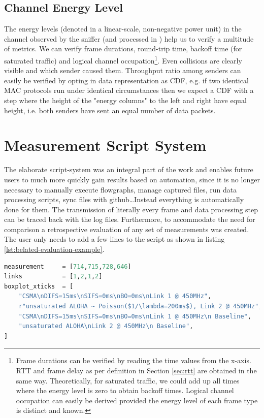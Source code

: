\subsection{Channel Energy Level}

The energy levels (denoted in a linear-scale, non-negative power unit) in the channel observed by the sniffer (and processed in ) help us to verify a multitude of metrics. We can verify frame durations, round-trip time, backoff time (for saturated traffic) and logical channel occupation\footnote{Frame durations can be verified by reading the time values from the x-axis. RTT and frame delay as per definition in Section \ref{sec:rtt} are obtained in the same way. Theoretically, for saturated traffic, we could add up all times where the energy level is zero to obtain backoff times. Logical channel occupation can easily be derived provided the energy level of each frame type is distinct and known.}. Even collisions are clearly visible and which sender caused them. Throughput ratio among senders can easily be verified by opting in data representation as CDF, e.g. if two identical MAC protocols run under identical circumstances then we expect a CDF with a step where the height of the "energy columns" to the left and right have equal height, i.e. both senders have sent an equal number of data packets.

\section{Measurement Script System}
\label{sec:script-system}

The elaborate script-system was an integral part of the work and enables future users to much more quickly gain results based on automation, since it is no longer necessary to manually execute flowgraphs, manage captured files, run data processing scripts, sync files with github\ldots Instead everything is automatically done for them. The transmission of literally every frame and data processing step can be traced back with the log files. Furthermore, to accommodate the need for comparison a retrospective evaluation of any set of measurements  was created. The user only needs to add a few lines to the script as shown in listing \ref{lst:belated-evaluation-example}.
  
\begin{lstlisting}[language=Python,caption=Evaluation of measurements with \code{belated\_evaluation.py}. In \code{links} we denote the link we used in the corresponding measurement (compare Figure \ref{fig:measurement-setup}).,label=lst:belated-evaluation-example]
measurement     = [714,715,728,646]
links           = [1,2,1,2]
boxplot_xticks  = [
	"CSMA\nDIFS=15ms\nSIFS=0ms\nBO=0ms\nLink 1 @ 450MHz",
    r"unsaturated ALOHA ~ Poisson($1/\lambda=200ms$), Link 2 @ 450MHz",
    "CSMA\nDIFS=15ms\nSIFS=0ms\nBO=0ms\nLink 1 @ 450MHz\n Baseline",
    "unsaturated ALOHA\nLink 2 @ 450MHz\n Baseline",
]
\end{lstlisting}

